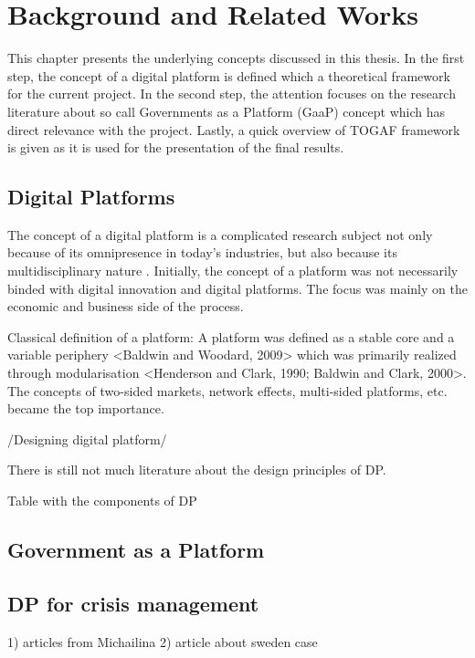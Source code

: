 \setcounter{reaction}{0}%


\chapter{Background and Related Works} \label{chapter2}

This chapter presents the underlying concepts discussed in this thesis. In the first step, the concept of a digital platform is defined which a theoretical framework for the current project. In the second step, the attention focuses on the research literature about so call Governments as a Platform (GaaP) concept which has direct relevance with the project. Lastly, a quick overview of TOGAF framework is given as it is used for the presentation of the final results.

\section{Digital Platforms}
The concept of a digital platform is a complicated research subject not only because of its omnipresence in today's industries, but also because its multidisciplinary nature \citep{deReuver:2018}. Initially, the concept of a platform was not necessarily binded with digital innovation and digital platforms. The focus was mainly on the economic and business side of the process. 

Classical definition of a platform: A platform was defined as a stable core and a variable periphery <Baldwin and Woodard, 2009> which was primarily realized through modularisation <Henderson and Clark, 1990; Baldwin and Clark, 2000>. The concepts of two-sided markets, network effects, multi-sided platforms, etc. became the top importance.

/Designing digital platform/ 

There is still not much literature about the design principles of DP.

Table with the components of DP

\section{Government as a Platform}



\section{DP for crisis management}
1) articles from Michailina
2) article about sweden case

